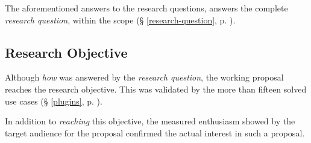 The aforementioned answers to the research questions, answers the complete
  \emph{research question}, within the scope (§ \ref{research-question},
  p. \pageref{research-question}).

\subsection{Research Objective}\label{q-research-objective}

Although \emph{how} was answered by the \emph{research question}, the
  working proposal reaches the research objective.
This was validated by the more than fifteen solved use cases
  (§ \ref{plugins}, p. \pageref{plugins}).

In addition to \emph{reaching} this objective, the measured enthusiasm
  showed by the target audience for the proposal confirmed the actual
  interest in such a proposal.
